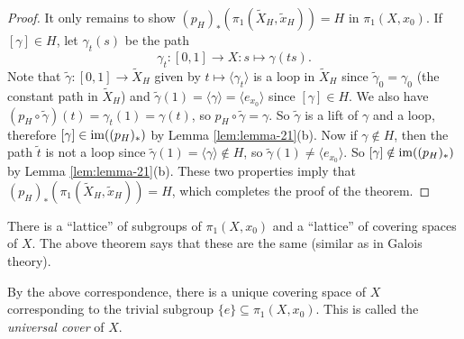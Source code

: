 \begin{proof}
  It only remains to show
  $(p_H)_*(\pi_1(\widetilde{X}_H, \widetilde{x}_H)) = H$
  in $\pi_1(X, x_{0})$.
  If $[\gamma] \in H$, let $\gamma_t(s)$ be the path
  \[
    \gamma_t : [0, 1] \to X : s \mapsto \gamma(ts).
  \]
  Note that $\widetilde{\gamma} : [0, 1] \to \widetilde{X}_H$
  given by $t \mapsto \langle \gamma_t \rangle$ is a
  loop in $\widetilde{X}_H$ since $\widetilde{\gamma}_0 = \gamma_0$
  (the constant path in $\widetilde{X}_H$)
  and $\widetilde{\gamma}(1) = \langle \gamma \rangle
  = \langle e_{x_0} \rangle$ since $[\gamma] \in H$.
  We also have $(p_H \circ \widetilde{\gamma})(t) = \gamma_t(1) = \gamma(t)$,
  so $p_H \circ \widetilde{\gamma} = \gamma$.
  So $\widetilde{\gamma}$ is a lift of $\gamma$ 
  and a loop, therefore $[\gamma] \in \operatorname{im}((p_H)_*)$
  by Lemma \ref{lem:lemma-21}(b). Now if
  $\gamma \notin H$, then the path
  $\widetilde{t}$ is not a loop since
  $\widetilde{\gamma}(1) = \langle \gamma \rangle \notin H$,
  so $\widetilde{\gamma}(1) \ne \langle e_{x_0} \rangle$.
  So $[\gamma] \notin \operatorname{im}((p_H)_*)$ by Lemma \ref{lem:lemma-21}(b).
  These two properties imply that
  $(p_H)_*(\pi_1(\widetilde{X}_H, \widetilde{x}_H)) = H$,
  which completes the proof of the theorem.
\end{proof}

\begin{remark}
  There is a ``lattice'' of subgroups of
  $\pi_1(X, x_0)$ and a ``lattice'' of covering
  spaces of $X$. The above theorem says that these are
  the same (similar as in Galois theory).
\end{remark}

\begin{remark}
  By the above correspondence, there is a unique covering
  space of $X$ corresponding to the trivial subgroup $\{e\} \subseteq \pi_1(X, x_0)$. This is
  called the \emph{universal cover} of $X$.
\end{remark}
